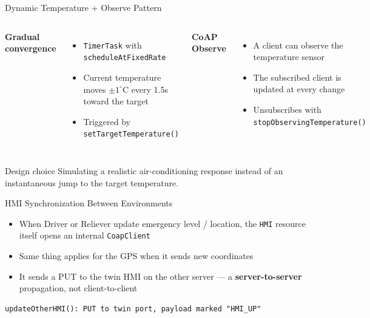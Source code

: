 \documentclass[aspectratio=169]{beamer}
\begin{document}
\begin{frame}{Dynamic Temperature + Observe Pattern}
\begin{columns}
\textbf{Gradual convergence}
\begin{itemize}
\item \texttt{TimerTask} with \texttt{scheduleAtFixedRate}
\item Current temperature moves $\pm1^\circ$C every 1.5s toward the target
\item Triggered by \texttt{setTargetTemperature()}
\end{itemize}
\textbf{CoAP Observe}
\begin{itemize}
\item A client can observe the temperature sensor
\item The subscribed client is updated at every change
\item Unsubscribes with \texttt{stopObservingTemperature()}
\end{itemize}
\end{columns}
\vspace{0.4cm}
\begin{block}{Design choice}
Simulating a realistic air-conditioning response instead of an instantaneous jump to the target temperature.
\end{block}
\end{frame}

\begin{frame}[fragile]{HMI Synchronization Between Environments}
\begin{itemize}
\item When Driver or Reliever update emergency level / location,  the \texttt{HMI} resource itself opens an internal \texttt{CoapClient}
\item Same thing applies for the GPS when it sends new coordinates
\item It sends a PUT to the twin HMI on the other server — a \textbf{server-to-server} propagation, not client-to-client
\end{itemize}
\vspace{1cm}
\begin{lstlisting}
updateOtherHMI(): PUT to twin port, payload marked "HMI_UP"
\end{lstlisting}

\end{frame}
\end{document}
